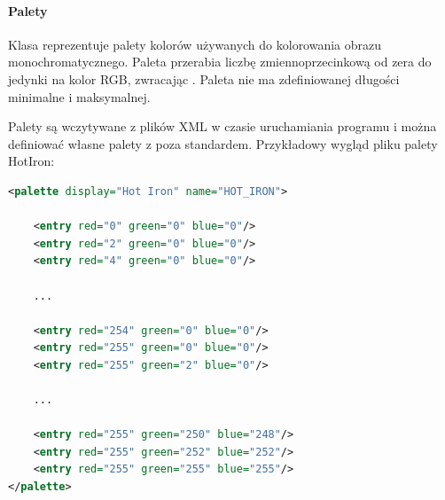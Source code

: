 \paragraph{Palety}
Klasa  reprezentuje palety kolorów używanych do kolorowania obrazu monochromatycznego.
Paleta przerabia liczbę zmiennoprzecinkową od zera do jedynki na kolor RGB, zwracając .
Paleta nie ma zdefiniowanej długości minimalne i maksymalnej.

\par
Palety są wczytywane z plików XML w czasie uruchamiania programu i można definiować własne palety z poza standardem.
Przykładowy wygląd pliku palety HotIron:
\begin{lstlisting}[language=XML]
<palette display="Hot Iron" name="HOT_IRON">

    <entry red="0" green="0" blue="0"/>
    <entry red="2" green="0" blue="0"/>
    <entry red="4" green="0" blue="0"/>

    ...

    <entry red="254" green="0" blue="0"/>
    <entry red="255" green="0" blue="0"/>
    <entry red="255" green="2" blue="0"/>

    ...

    <entry red="255" green="250" blue="248"/>
    <entry red="255" green="252" blue="252"/>
    <entry red="255" green="255" blue="255"/>
</palette>
\end{lstlisting}